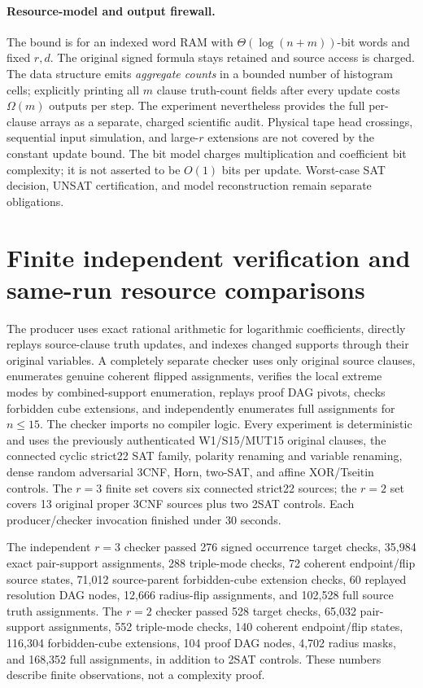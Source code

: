 \documentclass[11pt]{article}
\begin{document}
\paragraph{Resource-model and output firewall.} The bound is for an indexed word RAM with $\Theta(\log(n+m))$-bit words and fixed $r,d$. The original signed formula stays retained and source access is charged. The data structure emits \emph{aggregate counts} in a bounded number of histogram cells; explicitly printing all $m$ clause truth-count fields after every update costs $\Omega(m)$ outputs per step. The experiment nevertheless provides the full per-clause arrays as a separate, charged scientific audit. Physical tape head crossings, sequential input simulation, and large-$r$ extensions are not covered by the constant update bound. The bit model charges multiplication and coefficient bit complexity; it is not asserted to be $O(1)$ bits per update. Worst-case SAT decision, UNSAT certification, and model reconstruction remain separate obligations.

\section{Finite independent verification and same-run resource comparisons}
The producer uses exact rational arithmetic for logarithmic coefficients, directly replays source-clause truth updates, and indexes changed supports through their original variables. A completely separate checker uses only original source clauses, enumerates genuine coherent flipped assignments, verifies the local extreme modes by combined-support enumeration, replays proof DAG pivots, checks forbidden cube extensions, and independently enumerates full assignments for $n\le15$. The checker imports no compiler logic. Every experiment is deterministic and uses the previously authenticated W1/S15/MUT15 original clauses, the connected cyclic strict22 SAT family, polarity renaming and variable renaming, dense random adversarial 3CNF, Horn, two-SAT, and affine XOR/Tseitin controls. The $r=3$ finite set covers six connected strict22 sources; the $r=2$ set covers 13 original proper 3CNF sources plus two 2SAT controls. Each producer/checker invocation finished under 30 seconds.

The independent $r=3$ checker passed 276 signed occurrence target checks, 35,984 exact pair-support assignments, 288 triple-mode checks, 72 coherent endpoint/flip source states, 71,012 source-parent forbidden-cube extension checks, 60 replayed resolution DAG nodes, 12,666 radius-flip assignments, and 102,528 full source truth assignments. The $r=2$ checker passed 528 target checks, 65,032 pair-support assignments, 552 triple-mode checks, 140 coherent endpoint/flip states, 116,304 forbidden-cube extensions, 104 proof DAG nodes, 4,702 radius masks, and 168,352 full assignments, in addition to 2SAT controls. These numbers describe finite observations, not a complexity proof.
\end{document}
